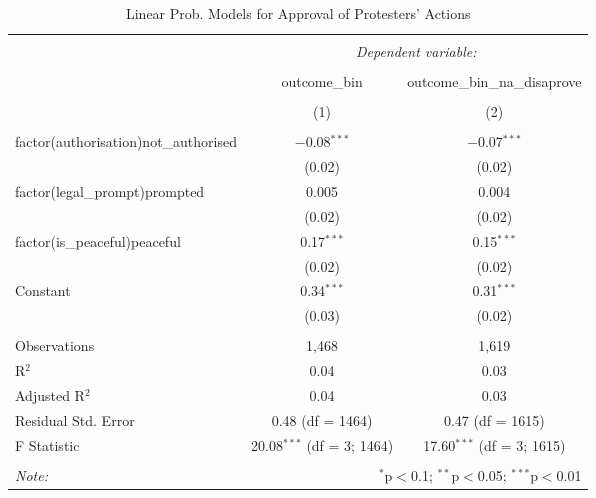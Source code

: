 
\begin{table}[!htbp] \centering 
  \caption{Linear Prob. Models for Approval of Protesters' Actions} 
  \label{} 
\begin{tabular}{@{\extracolsep{5pt}}lcc} 
\\[-1.8ex]\hline 
\hline \\[-1.8ex] 
 & \multicolumn{2}{c}{\textit{Dependent variable:}} \\ 
\cline{2-3} 
\\[-1.8ex] & outcome\_bin & outcome\_bin\_na\_disaprove \\ 
\\[-1.8ex] & (1) & (2)\\ 
\hline \\[-1.8ex] 
 factor(authorisation)not\_authorised & $-$0.08$^{***}$ & $-$0.07$^{***}$ \\ 
  & (0.02) & (0.02) \\ 
  factor(legal\_prompt)prompted & 0.005 & 0.004 \\ 
  & (0.02) & (0.02) \\ 
  factor(is\_peaceful)peaceful & 0.17$^{***}$ & 0.15$^{***}$ \\ 
  & (0.02) & (0.02) \\ 
  Constant & 0.34$^{***}$ & 0.31$^{***}$ \\ 
  & (0.03) & (0.02) \\ 
 \hline \\[-1.8ex] 
Observations & 1,468 & 1,619 \\ 
R$^{2}$ & 0.04 & 0.03 \\ 
Adjusted R$^{2}$ & 0.04 & 0.03 \\ 
Residual Std. Error & 0.48 (df = 1464) & 0.47 (df = 1615) \\ 
F Statistic & 20.08$^{***}$ (df = 3; 1464) & 17.60$^{***}$ (df = 3; 1615) \\ 
\hline 
\hline \\[-1.8ex] 
\textit{Note:}  & \multicolumn{2}{r}{$^{*}$p$<$0.1; $^{**}$p$<$0.05; $^{***}$p$<$0.01} \\ 
\end{tabular} 
\end{table} 
